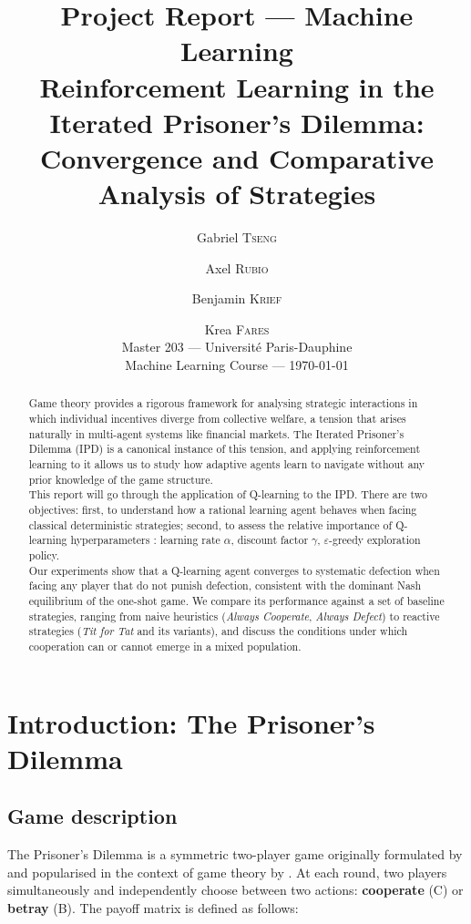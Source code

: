 \documentclass[11pt, a4paper]{article}
\title{
  \vspace{-1cm}
  {\Large Project Report — Machine Learning}\\[0.4em]
  {\LARGE \textbf{Reinforcement Learning in the Iterated Prisoner's Dilemma:}}\\[0.3em]
  {\Large Convergence and Comparative Analysis of Strategies}
}
\author{
  Gabriel \textsc{Tseng} \and
  Axel \textsc{Rubio} \and
  Benjamin \textsc{Krief} \and
  Krea \textsc{Fares}\\[0.5em]
  \small Master 203 — Université Paris-Dauphine\\
  \small Machine Learning Course — \today
}
\date{}
\begin{document}
\maketitle
\thispagestyle{empty}

\begin{abstract}

Game theory provides a rigorous framework for analysing strategic interactions in which individual incentives diverge from collective welfare, 
a tension that arises naturally in multi-agent systems like financial markets. 
The Iterated Prisoner's Dilemma (IPD) is a canonical instance of this tension, and applying reinforcement learning to it allows us to study how adaptive agents 
learn to navigate without any prior knowledge of the game structure.\\

This report will go through the application of Q-learning to the IPD. 
There are two objectives: first, to understand how a rational learning agent behaves when facing classical deterministic strategies; 
second, to assess the relative importance of Q-learning hyperparameters : learning rate $\alpha$, discount factor $\gamma$, $\varepsilon$-greedy exploration policy.\\

Our experiments show that a Q-learning agent converges to systematic defection when facing any player that do not punish defection, consistent with the dominant Nash equilibrium of the one-shot game. 
We compare its performance against a set of baseline strategies, ranging from naive heuristics (\textit{Always Cooperate}, \textit{Always Defect}) to reactive strategies (\textit{Tit for Tat} and its variants), and discuss the conditions under which cooperation can or cannot emerge in a mixed population.
\end{abstract}

\newpage
\tableofcontents
\newpage

\section{Introduction: The Prisoner's Dilemma}
\label{sec:intro}

\subsection{Game description}

The Prisoner's Dilemma is a symmetric two-player game originally formulated by \citet{tucker1950} and popularised in the context of game theory by \citet{axelrod1984}. At each round, two players simultaneously and independently choose between two actions: \textbf{cooperate} (C) or \textbf{betray} (B). The payoff matrix is defined as follows:
\end{document}
